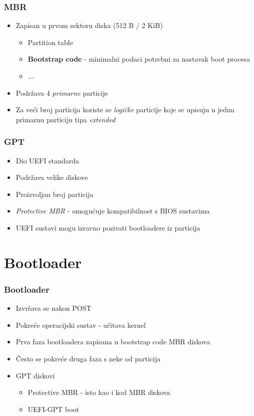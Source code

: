\documentclass[t]{beamer}
\begin{document}
\begin{frame}
	\frametitle{MBR}
	\begin{itemize}
		\item Zapisan u prvom sektoru diska (512 B / 2 KiB)
		\begin{itemize}
			\item Partition table
			\item \textbf{Bootstrap code} - minimalni podaci potrebni za nastavak boot procesa
			\item ...
		\end{itemize}
		\item Podržava 4 \emph{primarne} particije
		\item Za veći broj particija koriste se \emph{logičke} particije koje se upisuju u jednu primarnu particiju tipa \emph{extended}
	\end{itemize}
\end{frame}

\begin{frame}
	\frametitle{GPT}
	\begin{itemize}
		\item Dio UEFI standarda
		\item Podržava velike diskove 
		\item Proizvoljan broj particija
	\end{itemize}
	\begin{itemize}
		\item \emph{Protective MBR} - omogućuje kompatibilnost s BIOS sustavima
		\item UEFI sustavi mogu izravno pozivati bootloadere iz particija
	\end{itemize}
\end{frame}

\section{Bootloader}
\begin{frame}
	\frametitle{Bootloader}
	\begin{itemize}
		\item Izvršava se nakon POST
		\item Pokreće operacijski sustav - učitava kernel
	\end{itemize}
	
	\begin{itemize}
		\item Prva faza bootloadera zapisana u bootstrap code MBR diskova
		\item Često se pokreće druga faza s neke od particija
	\end{itemize}
	\begin{itemize}
		\item GPT diskovi
		\begin{itemize}
	 		\item Protective MBR - isto kao i kod MBR diskova
			\item UEFI-GPT boot
		\end{itemize}
	\end{itemize}
\end{frame}
\end{document}
